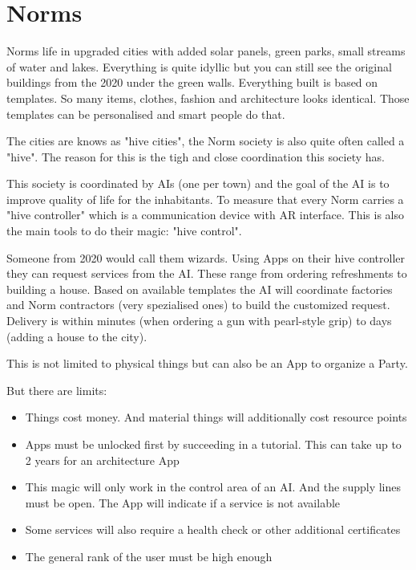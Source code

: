 \section{Norms}

Norms life in upgraded cities with added solar panels, green parks, small streams of water and lakes. Everything is quite idyllic but you can still see the original buildings from the 2020 under the green walls.
Everything built is based on templates. So many items, clothes, fashion and architecture looks identical. Those templates can be personalised and smart people do that.

The cities are knows as "hive cities", the Norm society is also quite often called a "hive". The reason for this is the tigh and close coordination this society has.

This society is coordinated by AIs (one per town) and the goal of the AI is to improve quality of life for the inhabitants.
To measure that every Norm carries a "hive controller" which is a communication device with AR interface. This is also the main tools to do their magic: "hive control".

Someone from 2020 would call them wizards. Using Apps on their hive controller they can request services from the AI. These range from ordering refreshments to building a house. Based on available templates the AI will coordinate factories and Norm contractors (very spezialised ones) to build the customized request.
Delivery is within minutes (when ordering a gun with pearl-style grip) to days (adding a house to the city).

This is not limited to physical things but can also be an App to organize a Party.

But there are limits:

\begin{itemize}
    \item Things cost money. And material things will additionally cost resource points
    \item Apps must be unlocked first by succeeding in a tutorial. This can take up to 2 years for an architecture App
    \item This magic will only work in the control area of an AI. And the supply lines must be open. The App will indicate if a service is not available
    \item Some services will also require a health check or other additional certificates
    \item The general rank of the user must be high enough
\end{itemize}

